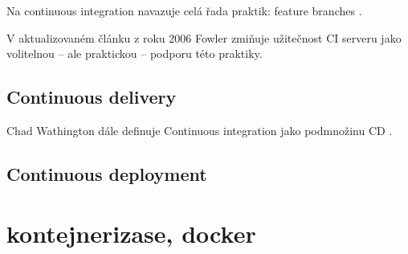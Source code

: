             Na continuous integration navazuje celá řada praktik: feature branches .

            V aktualizovaném článku z roku 2006 Fowler \cite{fowler-ci} zmiňuje užitečnost CI serveru jako volitelnou -- ale praktickou -- podporu této praktiky.

        \subsection{Continuous delivery}
            Chad Wathington dále definuje Continuous integration jako podmnožinu CD \cite{fowler-go}.

        \subsection{Continuous deployment}


        \blind[6]

    \section{kontejnerizase, docker}
        \blind[2]
